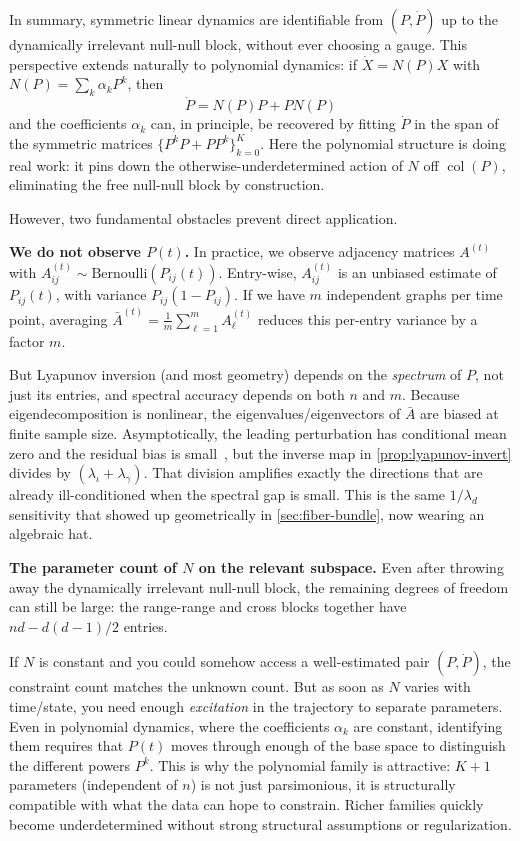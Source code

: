 \documentclass{article}
\DeclareMathOperator{\col}{col}
\theoremstyle{plain}
\theoremstyle{definition}
\theoremstyle{remark}
\begin{document}
In summary, symmetric linear dynamics are identifiable from $(P, \dot{P})$ up to the dynamically irrelevant null-null block, without ever choosing a gauge.
This perspective extends naturally to polynomial dynamics: if $\dot{X} = N(P) X$ with $N(P) = \sum_k \alpha_k P^k$, then
\begin{equation}
\dot{P} = N(P) P + P N(P)
\end{equation}
and the coefficients $\alpha_k$ can, in principle, be recovered by fitting $\dot{P}$ in the span of the symmetric matrices $\{P^k P + P P^k\}_{k=0}^K$.
Here the polynomial structure is doing real work: it pins down the otherwise-underdetermined action of $N$ off $\col(P)$, eliminating the free null-null block by construction.

However, two fundamental obstacles prevent direct application.

\textbf{We do not observe $P(t)$.}
In practice, we observe adjacency matrices $A^{(t)}$ with $A_{ij}^{(t)} \sim \text{Bernoulli}(P_{ij}(t))$.
Entry-wise, $A_{ij}^{(t)}$ is an unbiased estimate of $P_{ij}(t)$, with variance $P_{ij}(1 - P_{ij})$.
If we have $m$ independent graphs per time point, averaging $\bar{A}^{(t)} = \frac{1}{m} \sum_{\ell=1}^m A_\ell^{(t)}$ reduces this per-entry variance by a factor $m$.

But Lyapunov inversion (and most geometry) depends on the \emph{spectrum} of $P$, not just its entries, and spectral accuracy depends on both $n$ and $m$.
Because eigendecomposition is nonlinear, the eigenvalues/eigenvectors of $\bar{A}$ are biased at finite sample size.
Asymptotically, the leading perturbation has conditional mean zero and the residual bias is small~\citep{athreya2016limit,cape2019two}, but the inverse map in \cref{prop:lyapunov-invert} divides by $(\lambda_\iota + \lambda_\gamma)$.
That division amplifies exactly the directions that are already ill-conditioned when the spectral gap is small. This is the same $1/\lambda_d$ sensitivity that showed up geometrically in \cref{sec:fiber-bundle}, now wearing an algebraic hat.

\textbf{The parameter count of $N$ on the relevant subspace.}
Even after throwing away the dynamically irrelevant null-null block, the remaining degrees of freedom can still be large: the range-range and cross blocks together have $nd - d(d-1)/2$ entries.

If $N$ is constant and you could somehow access a well-estimated pair $(P, \dot{P})$, the constraint count matches the unknown count.
But as soon as $N$ varies with time/state, you need enough \emph{excitation} in the trajectory to separate parameters.
Even in polynomial dynamics, where the coefficients $\alpha_k$ are constant, identifying them requires that $P(t)$ moves through enough of the base space to distinguish the different powers $P^k$.
This is why the polynomial family is attractive: $K+1$ parameters (independent of $n$) is not just parsimonious, it is structurally compatible with what the data can hope to constrain.
Richer families quickly become underdetermined without strong structural assumptions or regularization.
\end{document}

